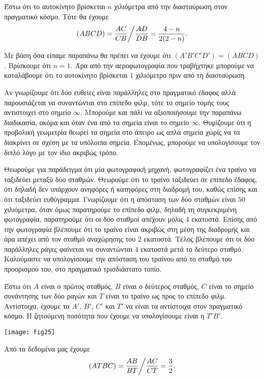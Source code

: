 \documentclass[12pt, a4paper]{book}
\begin{document}
Έστω ότι το αυτοκίνητο βρίσκεται $n$ χιλιόμετρα από την διασταύρωση στον πραγματικό κόσμο. Τότε θα έχουμε 
\begin{displaymath}
(ABCD)=\frac{AC}{CB}\bigg{/}\frac{AD}{DB}=\frac{4-n}{2(2-n)}.
\end{displaymath}

Με βάση όσα είπαμε παραπάνω θα πρέπει να έχουμε ότι $(A'B'C'D')= (ABCD)$. Βρίσκουμε ότι $n=1$. Άρα από την αεροφωτογραφία που τραβήχτηκε μπορούμε να καταλάβουμε ότι το αυτοκίνητο βρίσκεται $1$ χιλιόμετρο πριν από τη διασταύρωση.

Αν γνωρίζουμε ότι δύο ευθείες είναι παράλληλες στο πραγματικό έδαφος αλλά παρουσιάζεται να συναντώνται στο επίπεδο φιλμ, τότε το σημείο τομής τους αντιστοιχεί στο σημείο $\infty$. Μπορούμε και πάλι να αξιοποιήσουμε την παραπάνω διαδικασία,  ακόμα και όταν ένα από τα σημεία είναι το σημείο $\infty$. Θυμίζουμε ότι η προβολική γεωμετρία θεωρεί τα σημεία στο άπειρο ως απλά σημεία χωρίς να τα διακρίνει σε σχέση με τα υπόλοιπα σημεία. Επομένως, μπορούμε να υπολογίσουμε τον διπλό λόγο με τον ίδιο ακριβώς τρόπο.

Θεωρούμε για παράδειγμα ότι μία φωτογραφική μηχανή,  φωτογραφίζει ένα τραίνο να ταξιδεύει μεταξύ δύο σταθμών. Θεωρούμε ότι το τραίνο ταξιδεύει σε επίπεδο έδαφος, ότι δηλαδή δεν υπάρχουν ανηφόρες ή κατηφόρες στη διαδρομή του, καθώς επίσης και ότι ταξιδεύει ευθύγραμμα. Γνωρίζουμε ότι η απόσταση των δύο σταθμών είναι $50$ χιλιόμετρα, όταν όμως παρατηρούμε το επίπεδο φιλμ, δηλαδή τη συγκεκριμένη φωτογραφία, παρατηρούμε ότι οι δύο σταθμοί απέχουν μόλις $4$ εκατοστά. Επίσης από την φωτογραφία βλέπουμε ότι το τραίνο είναι ακριβώς στη μέση της διαδρομής και άρα απέχει από τον σταθμό αναχώρησης του $2$ εκατοστά. Τέλος βλέπουμε ότι οι δύο παράλληλες ράγες φαίνεται να συναντώνται $4$ εκατοστά μετά το δεύτερο σταθμό. Καλούμαστε να υπολογίσουμε την απόσταση του τραίνου από το σταθμό του προορισμού του, στο πραγματικό τρισδιάστατο τοπίο.

Έστω ότι $A$ είναι ο πρώτος σταθμός, $B$ είναι ο δεύτερος σταθμός, $C$ είναι το σημείο συνάντησης των δύο ραγών και $T$ είναι το τραίνο ως προς το επίπεδο φιλμ. Αντίστοιχα, έχουμε τα $A'$, $B'$, $C'$ και $T'$ να είναι τα αντίστοιχα στον πραγματικό κόσμο. Η ζητούμενη ποσότητα που έχουμε να υπολογίσουμε είναι η $T'B'$.

\begin{center}
\texttt{[image: fig25]}
\end{center}

Από τα δεδομένα μας έχουμε
\begin{displaymath}
(ATBC)=\frac{AB}{BT}\bigg{/}\frac{AC}{CT}=\frac{3}{2}.
\end{displaymath}
\end{document}
